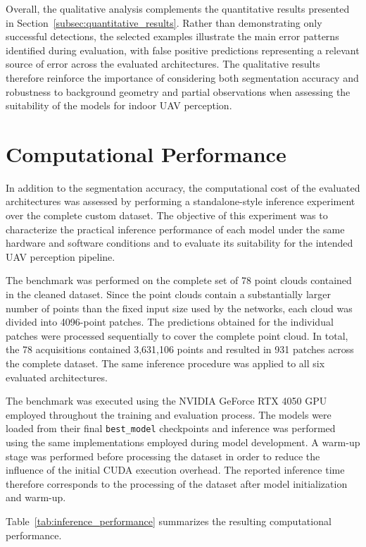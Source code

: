 Overall, the qualitative analysis complements the quantitative results presented in Section~\ref{subsec:quantitative_results}. Rather than demonstrating only successful detections, the selected examples illustrate the main error patterns identified during evaluation, with false positive predictions representing a relevant source of error across the evaluated architectures. The qualitative results therefore reinforce the importance of considering both segmentation accuracy and robustness to background geometry and partial observations when assessing the suitability of the models for indoor UAV perception.

\section{Computational Performance}
\label{sec:computational_performance}

In addition to the segmentation accuracy, the computational cost of the evaluated architectures was assessed by performing a standalone-style inference experiment over the complete custom dataset. The objective of this experiment was to characterize the practical inference performance of each model under the same hardware and software conditions and to evaluate its suitability for the intended UAV perception pipeline.

The benchmark was performed on the complete set of 78 point clouds contained in the cleaned dataset. Since the point clouds contain a substantially larger number of points than the fixed input size used by the networks, each cloud was divided into 4096-point patches. The predictions obtained for the individual patches were processed sequentially to cover the complete point cloud. In total, the 78 acquisitions contained 3,631,106 points and resulted in 931 patches across the complete dataset. The same inference procedure was applied to all six evaluated architectures.

The benchmark was executed using the NVIDIA GeForce RTX 4050 GPU employed throughout the training and evaluation process. The models were loaded from their final \texttt{best\_model} checkpoints and inference was performed using the same implementations employed during model development. A warm-up stage was performed before processing the dataset in order to reduce the influence of the initial CUDA execution overhead. The reported inference time therefore corresponds to the processing of the dataset after model initialization and warm-up.

Table~\ref{tab:inference_performance} summarizes the resulting computational performance.

